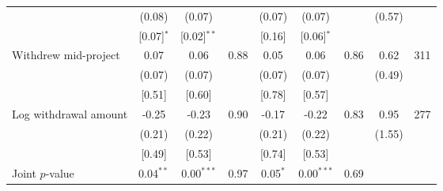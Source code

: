 \begin{table}[htbp]
{\begin{threeparttable}
\begin{tabular}{l*{8}{c}}
          &   (0.08)&   (0.07)&         &   (0.07)&   (0.07)&         &   (0.57)&         \\
          &[0.07]$^{*}$&[0.02]$^{**}$&         &   [0.16]&[0.06]$^{*}$&         &         &         \\
Withdrew mid-project&     0.07&     0.06&     0.88&     0.05&     0.06&     0.86&     0.62&      311\\
          &   (0.07)&   (0.07)&         &   (0.07)&   (0.07)&         &   (0.49)&         \\
          &   [0.51]&   [0.60]&         &   [0.78]&   [0.57]&         &         &         \\
Log withdrawal amount&    -0.25&    -0.23&     0.90&    -0.17&    -0.22&     0.83&     0.95&      277\\
          &   (0.21)&   (0.22)&         &   (0.21)&   (0.22)&         &   (1.55)&         \\
          &   [0.49]&   [0.53]&         &   [0.74]&   [0.53]&         &         &         \\
\midrule Joint \(p\)-value&0.04$^{**}$&0.00$^{***}$&     0.97&0.05$^{*}$&0.00$^{***}$&     0.69&         &         \\
\bottomrule \end{tabular} \begin{tablenotes}[flushleft] \footnotesize \item  \end{tablenotes} \end{threeparttable} } \end{table}
